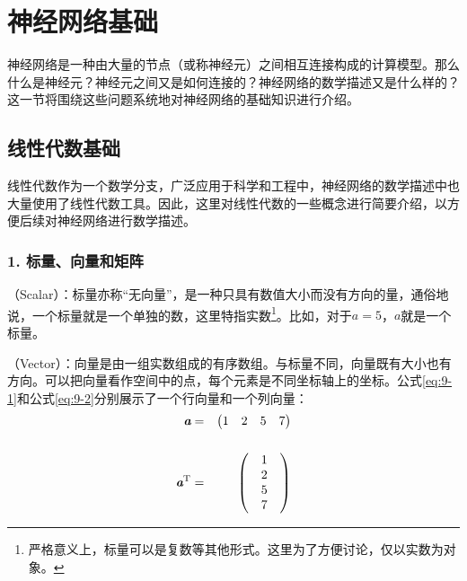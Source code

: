 
\sectionnewpage
\section{神经网络基础}

\parinterval 神经网络是一种由大量的节点（或称神经元）之间相互连接构成的计算模型。那么什么是神经元？神经元之间又是如何连接的？神经网络的数学描述又是什么样的？这一节将围绕这些问题系统地对神经网络的基础知识进行介绍。


\subsection{线性代数基础} \label{sec:9.2.1}

\parinterval 线性代数作为一个数学分支，广泛应用于科学和工程中，神经网络的数学描述中也大量使用了线性代数工具。因此，这里对线性代数的一些概念进行简要介绍，以方便后续对神经网络进行数学描述。


\subsubsection{1. 标量、向量和矩阵}

\vspace{-0.5em}
（Scalar）：标量亦称“无向量”，是一种只具有数值大小而没有方向的量，通俗地说，一个标量就是一个单独的数，这里特指实数\footnote{严格意义上，标量可以是复数等其他形式。这里为了方便讨论，仅以实数为对象。}。比如，对于$ a=5 $，$ a $就是一个标量。

（Vector）：向量是由一组实数组成的有序数组。与标量不同，向量既有大小也有方向。可以把向量看作空间中的点，每个元素是不同坐标轴上的坐标。公式\eqref{eq:9-1}和公式\eqref{eq:9-2}分别展示了一个行向量和一个列向量：
\begin{eqnarray}
\textbf{\em a} &=& \begin{pmatrix}
  1 & 2 & 5 & 7
\end{pmatrix}\label{eq:9-1}\\ \nonumber \\
\textbf{\em a}^{\textrm T} &=& \begin{pmatrix}
    &1& \\
    &2&\\
    &5& \\
    &7&\end{pmatrix}
\label{eq:9-2}
\end{eqnarray}


